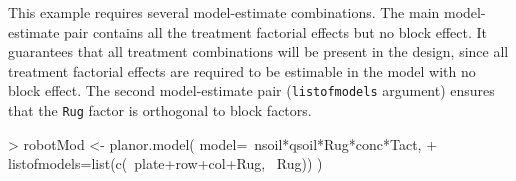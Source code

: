 \documentclass[a4paper]{article}
\begin{document}
This example requires several model-estimate combinations. The main
model-estimate pair contains all the treatment factorial effects but
no block effect. It guarantees that all treatment combinations will be
present in the design, since all treatment factorial effects are
required to be estimable in the model with no block effect. The second
model-estimate pair (\texttt{listofmodels} argument) ensures that the
\texttt{Rug} factor is orthogonal to block factors.

\begin{Schunk}
\begin{Sinput}
> robotMod <- planor.model( model=~nsoil*qsoil*Rug*conc*Tact,
+                           listofmodels=list(c(~plate+row+col+Rug, ~Rug)) )
\end{Sinput}
\end{Schunk}
\end{document}
